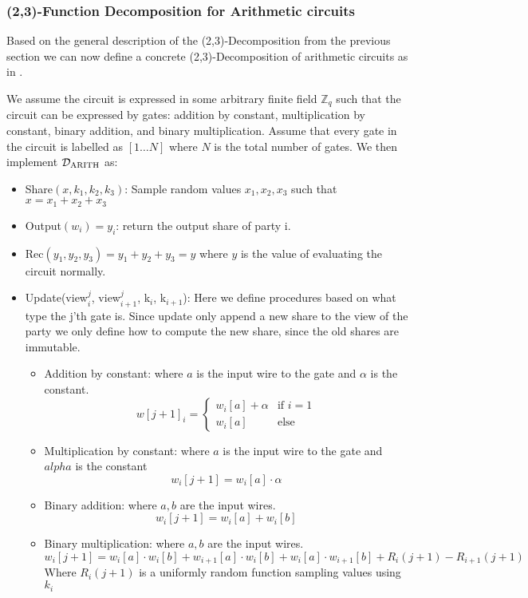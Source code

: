 \subsubsection{(2,3)-Function Decomposition for Arithmetic circuits}
\label{subsec:general:arith}
Based on the general description of the (2,3)-Decomposition from the previous
section we can now define a concrete (2,3)-Decomposition of arithmetic circuits
as in \citet{zkboo}.

We assume the circuit is expressed in some arbitrary finite field
$\mathbb{Z}_{q}$ such that the circuit can be expressed by gates: addition by constant,
multiplication by constant, binary addition, and binary multiplication.
Assume that every gate in the circuit is labelled as $[1 \dots N]$ where $N$ is
the total number of gates.
We then implement $\mathcal{D}_{\text{ARITH}}$ as:

\begin{itemize}
  \item Share$(x, k_{1}, k_{2}, k_{3})$: Sample random values
    $x_{1}, x_{2}, x_{3}$ such that $x = x_{1} + x_{2} + x_{3}$
  \item Output$(w_{i}) = y_{i}$: return the output share of party i.
  \item Rec$(y_{1}, y_{2}, y_{3}) = y_{1} + y_{2} + y_{3} = y$ where $y$ is the
    value of evaluating the circuit normally.
  \item Update(view$^{j}_{i}$, view$^{j}_{i+1}$, k$_{i}$, k$_{i+1}$): Here we
    define procedures based on what type the j'th gate is. Since update only
    append a new share to the view of the party we only define how to compute
    the new share, since the old shares are immutable.
    \begin{itemize}
      \item Addition by constant: where $a$ is the input wire to the gate
        and $\alpha$ is the constant.
        $$ w[j+1]_{i} =
        \begin{cases} w_{i}[a] + \alpha & \text{if } i = 1 \\
                      w_{i}[a]          & \text{else}       %
        \end{cases}$$
      \item Multiplication by constant: where $a$ is the input wire to the gate
        and $alpha$ is the constant
        $$ w_{i}[j+1] = w_{i}[a] \cdot \alpha$$
      \item Binary addition: where $a, b$ are the input wires.
        $$
        w_{i}[j+1] = w_{i}[a] + w_{i}[b]
        $$
      \item Binary multiplication: where $a, b$ are the input wires.
        $$
        w_{i}[j+1] = w_{i}[a] \cdot w_{i}[b] + w_{i+1}[a] \cdot w_{i}[b] + w_{i}[a] \cdot w_{i+1}[b] + R_{i}(j+1) - R_{i+1}(j+1)
        $$
        Where $R_{i}(j+1)$ is a uniformly random function sampling values using $k_{i}$
    \end{itemize}
\end{itemize}

